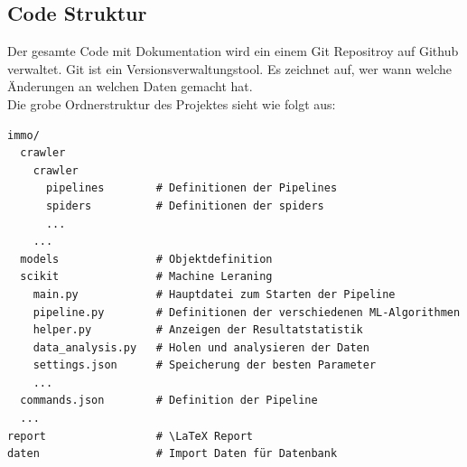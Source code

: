\subsection{Code Struktur}
Der gesamte Code mit Dokumentation wird ein einem Git Repositroy auf Github verwaltet. Git ist ein Versionsverwaltungstool. Es zeichnet auf, wer wann welche Änderungen an welchen Daten gemacht hat.\\
Die grobe Ordnerstruktur des Projektes sieht wie folgt aus:
\begin{verbatim}
immo/
  crawler
    crawler
      pipelines        # Definitionen der Pipelines
      spiders          # Definitionen der spiders
      ...
    ...
  models               # Objektdefinition
  scikit               # Machine Leraning 
    main.py            # Hauptdatei zum Starten der Pipeline
    pipeline.py        # Definitionen der verschiedenen ML-Algorithmen
    helper.py          # Anzeigen der Resultatstatistik
    data_analysis.py   # Holen und analysieren der Daten
    settings.json      # Speicherung der besten Parameter
    ...
  commands.json        # Definition der Pipeline
  ...
report                 # \LaTeX Report
daten                  # Import Daten für Datenbank
\end{verbatim}
